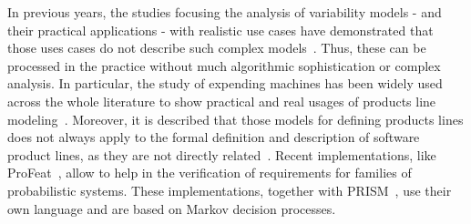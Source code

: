 In previous years, the studies focusing the analysis of variability models  - and
their practical applications - with realistic use cases
have demonstrated that those uses cases do not describe such complex models~\cite{jhf11, jhfes12}. Thus, these
can be processed in the practice without much algorithmic sophistication or
complex analysis.
In particular, the study of expending machines
has been widely used across the whole
literature to show practical and real usages of products
line modeling~\cite{jhfes12}. Moreover, it is described that those models for defining products
lines does not always apply to the
formal definition and description of software
product lines, as they are not directly related~\cite{cds06, fub06, nnz14}.
Recent implementations, like ProFeat~\cite{Chrszon2018}, allow to
help in the verification of requirements for families of probabilistic systems. These implementations,
together with PRISM~\cite{mgd12}, use their own language and are based on Markov decision processes.














